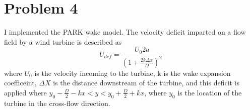 \documentclass{article}
\begin{document}
\section{Problem 4}
I implemented the PARK wake model. The velocity deficit imparted on a flow field by a wind turbine is described as
\begin{equation}
U_{def} = \frac{U_0 2a}{( 1 + \frac{ 2 k \Delta x}{D}) ^ 2}
\end{equation}
where $U_0$ is the velocity incoming to the turbine, k is the wake expansion coefficeint, $\Delta X$ is the distance downstream of the turbine, and this deficit is applied where $y_0 - \frac{D}{2} - kx < y <  y_0 + \frac{D}{2} + kx$, where $y_0$ is the location of the turbine in the cross-flow direction.
\end{document}
